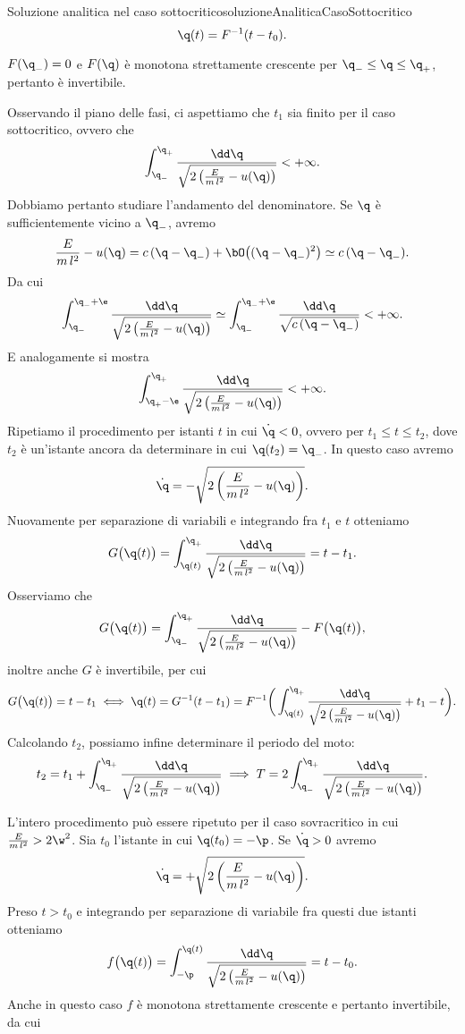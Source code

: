 \begin{remark}{Soluzione analitica nel caso sottocritico}{soluzioneAnaliticaCasoSottocritico}
	\[
		\q(t) = F^{-1}(t-t_0).
	\]
\end{remark}

\begin{oss}
	\(F(\q_-)=0\) e \(F(\q)\) è monotona strettamente crescente per \(\q_-\le \q \le \q_+\), pertanto è invertibile.
\end{oss}
\noindent
Osservando il piano delle fasi, ci aspettiamo che \(t_1\) sia finito per il caso sottocritico, ovvero che
\[
	\int_{\q_-}^{\q_+} \frac{\dd\q}{\sqrt{2 \left( \frac{E}{m\,l^2}-u(\q) \right)}} < +\infty.
\]
Dobbiamo pertanto studiare l'andamento del denominatore. Se \(\q\) è sufficientemente vicino a \(\q_-\), avremo
\[
	\frac{E}{m\,l^2} - u(\q) = c\,(\q-\q_-) + \bO\big((\q-\q_-)^2\big) \simeq c\,(\q-\q_-).
\]
Da cui
\[
	\int_{\q_-}^{\q_-+\e} \frac{\dd\q}{\sqrt{2 \left( \frac{E}{m\,l^2}-u(\q) \right)}} \simeq \int_{\q_-}^{\q_-+\e} \frac{\dd\q}{\sqrt{c\,(\q-\q_-)}} < +\infty.
\]
E analogamente si mostra
\[
	\int_{\q_+-\e}^{\q_+} \frac{\dd\q}{\sqrt{2 \left( \frac{E}{m\,l^2}-u(\q) \right)}} < +\infty.
\]
Ripetiamo il procedimento per istanti \(t\) in cui \(\dot{\q}<0\), ovvero per \(t_1\le t \le t_2\), dove \(t_2\) è un'istante ancora da determinare in cui \(\q(t_2)=\q_-\). In questo caso avremo
\[
	\dot{\q} = -\sqrt{2 \left( \frac{E}{m\,l^2}-u(\q) \right)}.
\]
Nuovamente per separazione di variabili e integrando fra \(t_1\) e \(t\) otteniamo
\[
	G\big(\q(t)\big) = \int_{\q(t)}^{\q_+} \frac{\dd\q}{\sqrt{2 \left( \frac{E}{m\,l^2}-u(\q) \right)}} = t-t_1.
\]
Osserviamo che
\[
	G\big(\q(t)\big) = \int_{\q_-}^{\q_+} \frac{\dd\q}{\sqrt{2 \left( \frac{E}{m\,l^2}-u(\q) \right)}} - F\big(\q(t)\big),
\]
inoltre anche \(G\) è invertibile, per cui
\[
	G\big(\q(t)\big) = t-t_1 \iff \q(t) = G^{-1}(t-t_1) = F^{-1} \bigg( \int_{\q(t)}^{\q_+} \frac{\dd\q}{\sqrt{2 \left( \frac{E}{m\,l^2}-u(\q) \right)}} + t_1-t \bigg).
\]
Calcolando \(t_2\), possiamo infine determinare il periodo del moto:
\[
	t_2 = t_1 + \int_{\q_-}^{\q_+} \frac{\dd\q}{\sqrt{2 \left( \frac{E}{m\,l^2}-u(\q) \right)}} \implies T = 2\int_{\q_-}^{\q_+} \frac{\dd\q}{\sqrt{2 \left( \frac{E}{m\,l^2}-u(\q) \right)}}.
\]

L'intero procedimento può essere ripetuto per il caso sovracritico in cui \(\frac{E}{m\,l^2} > 2\w^2\).
Sia \(t_0\) l'istante in cui \(\q(t_0)=-\p\). Se \(\dot{\q}>0\) avremo
\[
	\dot{\q} = +\sqrt{2 \left( \frac{E}{m\,l^2}-u(\q) \right)}.
\]
Preso \(t>t_0\) e integrando per separazione di variabile fra questi due istanti otteniamo
\[
	f\big(\q(t)\big) = \int_{-\p}^{\q(t)} \frac{\dd \q}{\sqrt{2 \left( \frac{E}{m\,l^2}-u(\q) \right)}} = t-t_0.
\]
Anche in questo caso \(f\) è monotona strettamente crescente e pertanto invertibile, da cui

